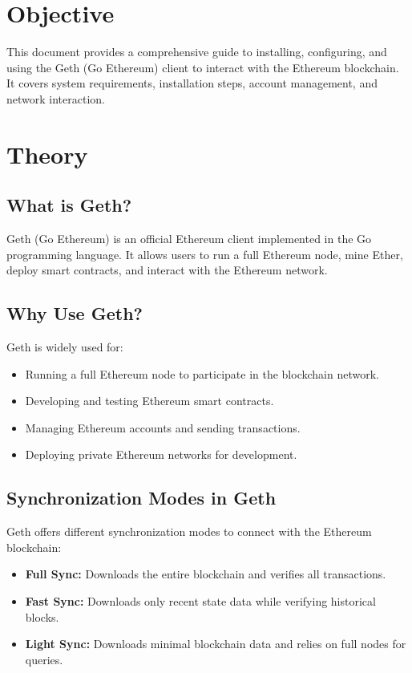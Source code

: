 \documentclass[11pt]{article}
\begin{document}
\tableofcontents
\thispagestyle{empty}
\clearpage

\section{Objective}
This document provides a comprehensive guide to installing, configuring, and using the Geth (Go Ethereum) client to interact with the Ethereum blockchain. It covers system requirements, installation steps, account management, and network interaction.

\section{Theory}

\subsection{What is Geth?}
Geth (Go Ethereum) is an official Ethereum client implemented in the Go programming language. It allows users to run a full Ethereum node, mine Ether, deploy smart contracts, and interact with the Ethereum network.

\subsection{Why Use Geth?}
Geth is widely used for:
\begin{itemize}
    \item Running a full Ethereum node to participate in the blockchain network.
    \item Developing and testing Ethereum smart contracts.
    \item Managing Ethereum accounts and sending transactions.
    \item Deploying private Ethereum networks for development.
\end{itemize}

\subsection{Synchronization Modes in Geth}
Geth offers different synchronization modes to connect with the Ethereum blockchain:
\begin{itemize}
    \item \textbf{Full Sync:} Downloads the entire blockchain and verifies all transactions.
    \item \textbf{Fast Sync:} Downloads only recent state data while verifying historical blocks.
    \item \textbf{Light Sync:} Downloads minimal blockchain data and relies on full nodes for queries.
\end{itemize}
\end{document}

